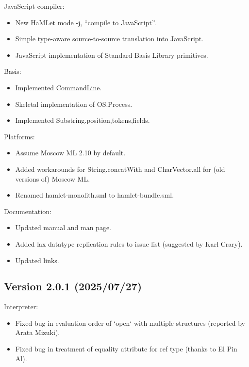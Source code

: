 \documentclass[twoside,titlepage]{article}
\begin{document}
\begin{appendix}
JavaScript compiler:
\begin{itemize}[nolistsep]
\item New HaMLet mode -j, ``compile to JavaScript''.
\item Simple type-aware source-to-source translation into JavaScript.
\item JavaScript implementation of Standard Basis Library primitives.
\end{itemize}

Basis:
\begin{itemize}[nolistsep]
\item Implemented CommandLine.
\item Skeletal implementation of OS.Process.
\item Implemented Substring.{position,tokens,fields}.
\end{itemize}

Platforms:
\begin{itemize}[nolistsep]
\item Assume Moscow ML 2.10 by default.
\item Added workarounds for String.concatWith and CharVector.all for (old versions of) Moscow ML.
\item Renamed hamlet-monolith.sml to hamlet-bundle.sml.
\end{itemize}

Documentation:
\begin{itemize}[nolistsep]
\item Updated manual and man page.
\item Added lax datatype replication rules to issue list (suggested by Karl Crary).
\item Updated links.
\end{itemize}


\subsection*{Version 2.0.1 (2025/07/27)}

Interpreter:
\begin{itemize}[nolistsep]
\item Fixed bug in evaluation order of `open` with multiple structures (reported by Arata Mizuki).
\item Fixed bug in treatment of equality attribute for ref type (thanks to El Pin Al).
\end{itemize}


\end{appendix}
\end{document}
